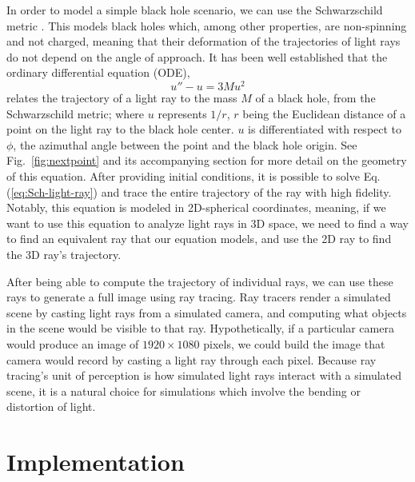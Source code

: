 In order to model a simple black hole scenario, we can use the Schwarzschild metric \cite{schw_soln-2007}.
This models black holes which, among other properties, are non-spinning and not charged,
meaning that their deformation of the trajectories of light rays do not depend on the angle of approach.
It has been well established \cite{gravitation-mtw} that the ordinary differential equation (ODE),
\begin{equation}
	u'' - u = 3 M u^2
	\label{eq:Sch-light-ray}
\end{equation}
relates the trajectory of a light ray to the mass $M$ of a black hole, from the Schwarzschild metric;
where $u$ represents $1/r$, $r$ being the Euclidean distance of a point on the light ray to the black hole center.
$u$ is differentiated with respect to $\phi$, the azimuthal angle between the point and the black hole origin.
See Fig.~\ref{fig:nextpoint} and its accompanying section for more detail on the geometry of this equation.
After providing initial conditions,  it is possible to solve Eq.(\ref{eq:Sch-light-ray}) and trace the entire trajectory of the ray with high fidelity.
Notably, this equation is modeled in 2D-spherical coordinates, meaning, if we want to use this equation to analyze light rays in 3D space, we need to find a way to find an equivalent ray that our equation models, and use the 2D ray to find the 3D ray's trajectory.

After being able to compute the trajectory of individual rays, we can use these rays to generate a full image using ray tracing. Ray tracers render a simulated scene by casting light rays from a simulated camera, and computing what objects in the scene would be visible to that ray. Hypothetically, if a particular camera would produce an image of $1920 \times 1080$ pixels, we could build the image that camera would record by casting a light ray through each pixel. Because ray tracing's unit of perception is how simulated light rays interact with a simulated scene, it is a natural choice for simulations which involve the bending or distortion of light.




\section{Implementation}
\label{sec:impl}


